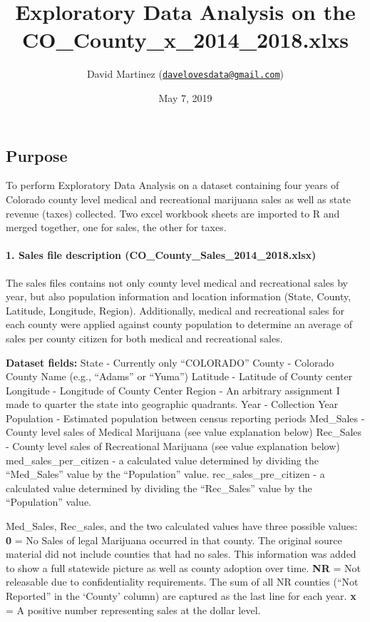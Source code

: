 \documentclass[]{article}
\title{Exploratory Data Analysis on the CO\_County\_x\_2014\_2018.xlxs}
\author{David Martinez
(\href{mailto:davelovesdata@gmail.com}{\nolinkurl{davelovesdata@gmail.com}})}
\date{May 7, 2019}
\let\oldparagraph\paragraph
\renewcommand{\paragraph}[1]{\oldparagraph{#1}\mbox{}}
\begin{document}
\maketitle

\hypertarget{purpose}{%
\subsection{Purpose}\label{purpose}}

To perform Exploratory Data Analysis on a dataset containing four years
of Colorado county level medical and recreational marijuana sales as
well as state revenue (taxes) collected. Two excel workbook sheets are
imported to R and merged together, one for sales, the other for taxes.

\hypertarget{sales-file-description-co_county_sales_2014_2018.xlsx}{%
\paragraph{\texorpdfstring{1. Sales file description
(CO\_County\_Sales\_2014\_2018.xlsx)}{1. Sales file description (CO\_County\_Sales\_2014\_2018.xlsx) }}\label{sales-file-description-co_county_sales_2014_2018.xlsx}}

The sales files contains not only county level medical and recreational
sales by year, but also population information and location information
(State, County, Latitude, Longitude, Region). Additionally, medical and
recreational sales for each county were applied against county
population to determine an average of sales per county citizen for both
medical and recreational sales.

\textbf{Dataset fields:} State - Currently only ``COLORADO'' County -
Colorado County Name (e.g., ``Adams'' or ``Yuma'') Latitude - Latitude
of County center Longitude - Longitude of County Center Region - An
arbitrary assignment I made to quarter the state into geographic
quadrants. Year - Collection Year Population - Estimated population
between census reporting periods Med\_Sales - County level sales of
Medical Marijuana (see value explanation below) Rec\_Sales - County
level sales of Recreational Marijuana (see value explanation below)
med\_sales\_per\_citizen - a calculated value determined by dividing the
``Med\_Sales'' value by the ``Population'' value.
rec\_sales\_pre\_citizen - a calculated value determined by dividing the
``Rec\_Sales'' value by the ``Population'' value.

Med\_Sales, Rec\_sales, and the two calculated values have three
possible values: \textbf{0} = No Sales of legal Marijuana occurred in
that county. The original source material did not include counties that
had no sales. This information was added to show a full statewide
picture as well as county adoption over time. \textbf{NR} = Not
releasable due to confidentiality requirements. The sum of all NR
counties (``Not Reported'' in the `County' column) are captured as the
last line for each year. \textbf{x} = A positive number representing
sales at the dollar level.
\end{document}
